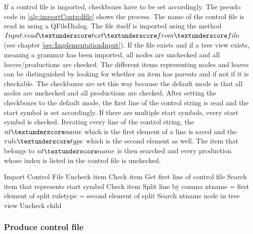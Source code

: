 If a control file is imported, checkboxes have to be set accordingly. The pseudo code in \ref{alg:importControlfile} shows the process. 
The name of the control file is read in using a QFileDialog. The file itself is imported using the method $Input.read\textunderscore text\textunderscore from\textunderscore file$ (see chapter \ref{sec:ImplementationInput}). If the file exists and if a tree view exists, meaning a grammar has been imported, all nodes are unchecked and all leaves/productions are checked. The different items representing nodes and leaves can be distinguished by looking for whether an item has parents and if not if it is checkable. The checkboxes are set this way because the default mode is that all nodes are unchecked and all productions are checked.  
After setting the checkboxes to the default mode, the first line of the control string is read and the start symbol is set accordingly. If there are multiple start symbols, every start symbol is checked.
Iterating every line of the control string, the $nt\textunderscore name$ which is the first element of a line is saved and the $rule\textunderscore type$ which is the second element as well. The item that belongs to $nt\textunderscore name$ is then searched and every production whose index is listed in the control file is unchecked.

\begin{algorithm}[H]
\caption{GUI Pseudo Code: load\textunderscore controlfile}
\label{alg:importControlfile}
\begin{algorithmic}[1] 
\State Import Control File
			\State Uncheck item
		\EndIf
	\Else
		\State Check item 
	\EndIf
\EndFor
\State Get first line of control file
\State Search item that represents start symbol 
\State Check item
	\State Split line by comma
	\State nt\textunderscore name = first element of split
	\State rule\textunderscore type = second element of split
	\State Search nt\textunderscore name node in tree view
				\State Uncheck child
			\EndIf
		\EndFor
	\EndIf 
\EndFor
\EndIf
\end{algorithmic}
\end{algorithm} 

\subsubsection{Produce control file}\label{sec:ImplementationGUIProduceControlFile}

